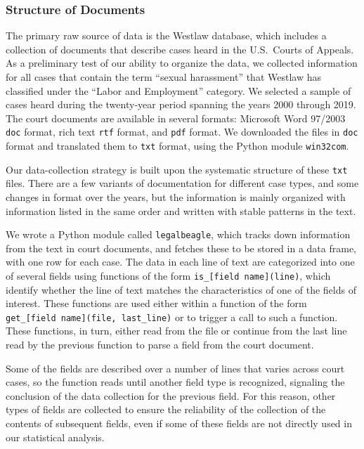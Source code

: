\documentclass[11pt]{paper}
\begin{document}
\subsubsection*{Structure of Documents}

The primary raw source of data is the Westlaw database, 
which includes a collection of documents that describe cases
heard in the U.S.~Courts of Appeals. 
As a preliminary test of our ability to organize the data, 
we collected information for all cases 
that contain the term ``sexual harassment''
that Westlaw has classified 
under the ``Labor and Employment'' category. 
We selected a sample of cases heard during
the twenty-year period spanning the years 2000 through 2019.  
The court documents are available in several formats: 
Microsoft Word 97/2003 \texttt{doc} format, 
rich text \texttt{rtf} format,
and \texttt{pdf} format. 
We downloaded the files in \texttt{doc} format
and translated them to \texttt{txt} format, 
using the Python module \texttt{win32com}. 

Our data-collection strategy is built upon
the systematic structure of these \texttt{txt} files. 
There are a few variants of documentation for different case types, 
and some changes in format over the years, 
but the information is mainly organized with information listed 
in the same order and written with stable patterns in the text. 

We wrote a Python module called \texttt{legalbeagle}, 
which tracks down information from the text in court documents, 
and fetches these to be stored in a data frame, 
with one row for each case. 
The data in each line of text are categorized into one of several fields 
using functions of the form \texttt{is\_[field name](line)}, 
which identify whether the line of text matches 
the characteristics of one of the fields of interest. 
These functions are used either within a function 
of the form \texttt{get\_[field name](file, last\_line)} 
or to trigger a call to such a function. 
These functions, in turn, either read from the file 
or continue from the last line read by the previous function
to parse a field from the court document. 

Some of the fields are described over a number of lines 
that varies across court cases, 
so the function reads until another field type is recognized, 
signaling the conclusion of the data collection for the previous field. 
For this reason, other types of fields are collected 
to ensure the reliability of the collection of the 
contents of subsequent fields, even if some of these fields 
are not directly used in our statistical analysis. 
\end{document}
